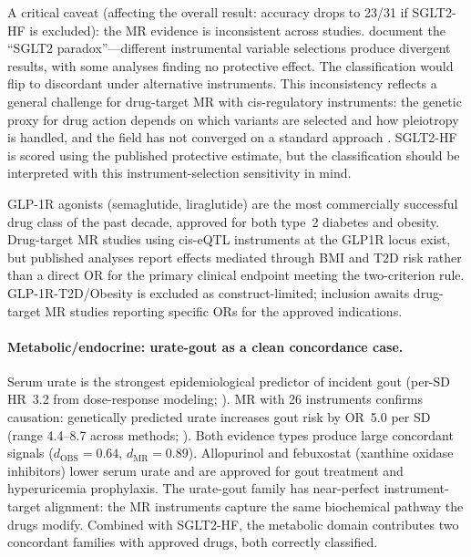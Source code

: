 \documentclass[11pt]{article}
\begin{document}
A critical caveat (affecting the overall result: accuracy drops to 23/31 if SGLT2-HF is excluded): the MR evidence is inconsistent across studies. \citet{sglt2paradox2025} document the ``SGLT2 paradox''---different instrumental variable selections produce divergent results, with some analyses finding no protective effect. The classification would flip to discordant under alternative instruments. This inconsistency reflects a general challenge for drug-target MR with cis-regulatory instruments: the genetic proxy for drug action depends on which variants are selected and how pleiotropy is handled, and the field has not converged on a standard approach \cite{gill2024pitfalls}. SGLT2-HF is scored using the published protective estimate, but the classification should be interpreted with this instrument-selection sensitivity in mind.

GLP-1R agonists (semaglutide, liraglutide) are the most commercially successful drug class of the past decade, approved for both type~2 diabetes and obesity. Drug-target MR studies using cis-eQTL instruments at the GLP1R locus exist, but published analyses report effects mediated through BMI and T2D risk rather than a direct OR for the primary clinical endpoint meeting the two-criterion rule. GLP-1R-T2D/Obesity is excluded as construct-limited; inclusion awaits drug-target MR studies reporting specific ORs for the approved indications.

\paragraph{Metabolic/endocrine: urate-gout as a clean concordance case.}
Serum urate is the strongest epidemiological predictor of incident gout (per-SD HR~3.2 from dose-response modeling; \cite{robinson2021urate}). MR with 26 instruments confirms causation: genetically predicted urate increases gout risk by OR~5.0 per SD (range 4.4--8.7 across methods; \cite{li2019uratemr}). Both evidence types produce large concordant signals ($d_{\text{OBS}} = 0.64$, $d_{\text{MR}} = 0.89$). Allopurinol and febuxostat (xanthine oxidase inhibitors) lower serum urate and are approved for gout treatment and hyperuricemia prophylaxis. The urate-gout family has near-perfect instrument-target alignment: the MR instruments capture the same biochemical pathway the drugs modify. Combined with SGLT2-HF, the metabolic domain contributes two concordant families with approved drugs, both correctly classified.
\end{document}
